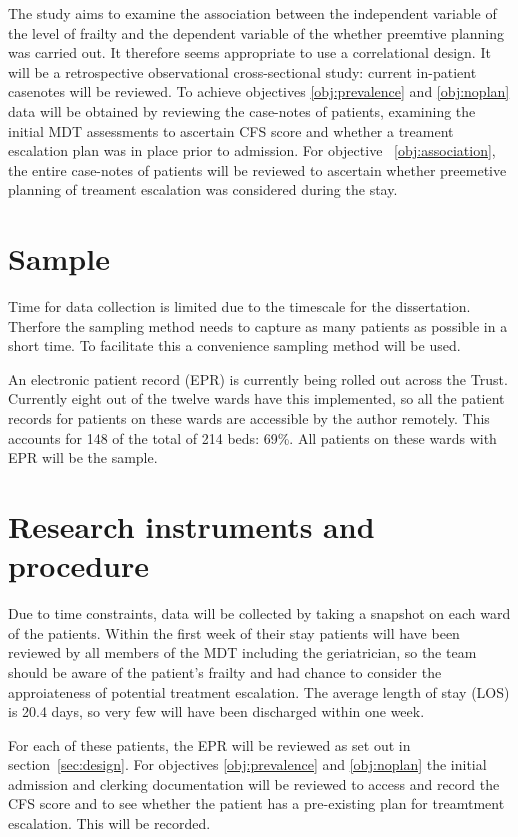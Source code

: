 \documentclass
[
	12pt,
	a4paper,
	oneside,
]{article}
\begin{document}
The study aims to examine the association between the independent variable of 
the level of frailty and the dependent variable of the whether preemtive planning
was carried out. It therefore seems appropriate to use a correlational design. 
It will be a retrospective observational 
cross-sectional study: current in-patient casenotes will be reviewed. To achieve objectives \ref{obj:prevalence}
and \ref{obj:noplan} data will be obtained by reviewing the case-notes
of patients, examining the initial MDT assessments to ascertain CFS score and 
whether a treament escalation plan was in place prior to admission. For objective~
\ref{obj:association}, the entire case-notes of patients will be reviewed to ascertain
whether preemetive planning of treament escalation was considered during the stay.

\section{Sample}
Time for data collection is limited due to the timescale for the dissertation. 
Therfore the sampling method needs to capture as many patients as possible in a 
short time. To facilitate this a convenience sampling method will be used.

An electronic patient record (EPR) is currently being rolled out across the Trust.
Currently eight out of the twelve wards have this implemented, so all the patient 
records for patients on these wards are accessible by the author remotely. This
accounts for 148 of the total of 214 beds: 69\%. All patients on these wards with
EPR will be the sample.


\section{Research instruments and procedure}
Due to time constraints, data will be collected by taking a snapshot on each ward 
of the patients. Within the first week of their stay patients will have been reviewed
by all members of the MDT including the geriatrician, so the team should be aware 
of the patient's frailty and had chance to consider the approiateness of potential 
treatment escalation. The average length of stay (LOS) is 20.4 days, so very few 
will have been discharged within one week.

For each of these patients, the EPR will be reviewed as set out in 
section~\ref{sec:design}. For objectives \ref{obj:prevalence} and \ref{obj:noplan} 
the initial admission and clerking documentation will be reviewed to access and 
record the CFS score and to see whether the patient has a pre-existing plan 
for treamtment escalation. This will be recorded.
\end{document}
